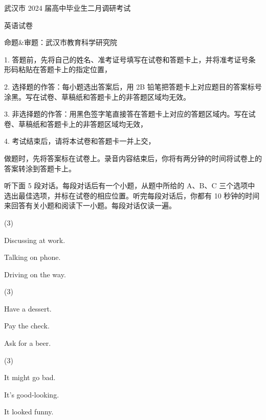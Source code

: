 \documentclass{英语试卷}
\begin{document}
\par 武汉市 2024 届高中毕业生二月调研考试\par
\par 英语试卷\par
\par 命题\&审题：武汉市教育科学研究院\par
\begin{notice}
\par 1. 答题前，先将自己的姓名、准考证号填写在试卷和答题卡上，并将准考证号条形码粘贴在答题卡上的指定位置，\par
\par 2. 选择题的作答：每小题选出答案后，用 2B 铅笔把答题卡上对应题目的答案标号涂黑。写在试卷、草稿纸和答题卡上的非答题区域均无效。\par
\par 3. 非选择题的作答：用黑色签字笔直接答在答题卡上对应的答题区域内。写在试卷、草稿纸和答题卡上的非答题区域均无效，\par
\par 4. 考试结束后，请将本试卷和答题卡一并上交，\par
\end{notice}
\par 做题时，先将答案标在试卷上。录音内容结束后，你将有两分钟的时间将试卷上的答案转涂到答题卡上。\par
{}
\par 听下面 5 段对话。每段对话后有一个小题，从题中所给的 A、B、C 三个选项中选出最佳选项，并标在试卷的相应位置。听完每段对话后，你都有 10 秒钟的时间来回答有关小题和阅读下一小题。每段对话仅读一遍。\par
{}
\begin{choices}(3)
  \item Discussing at work.
  \item Talking on phone.
  \item Driving on the way.
\end{choices}
\begin{choices}(3)
  \item Have a dessert.
  \item Pay the check.
  \item Ask for a beer.
\end{choices}
\begin{choices}(3)
  \item It might go bad.
  \item It's good-looking.
  \item It looked funny.
\end{choices}
\end{document}
